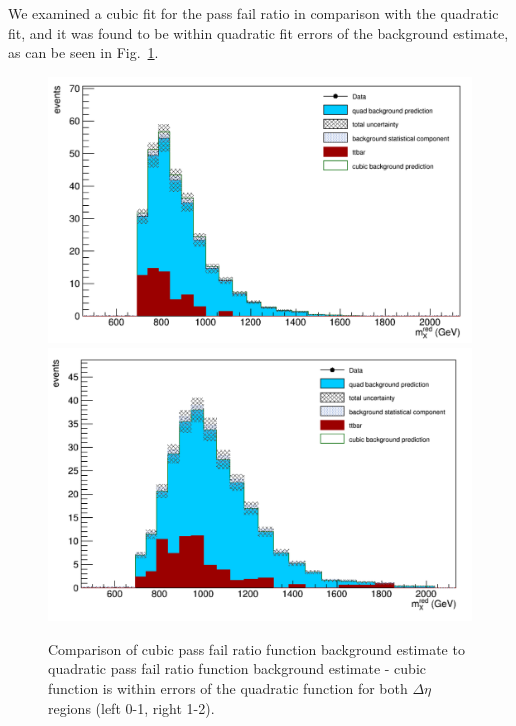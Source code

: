 We examined a cubic fit for the pass fail ratio in comparison with the quadratic fit, and it was found to be within quadratic fit errors of the background estimate, as can be seen in Fig.~\ref{fig:cvqhist}.

\begin{figure}[thb!]
\begin{center}
\includegraphics[scale=0.35]{Figures/dEta1CvQ.pdf}
\includegraphics[scale=0.35]{Figures/dEta2CvQ.pdf}\\
\end{center}
\caption{Comparison of cubic pass fail ratio function background estimate to quadratic pass fail ratio function background estimate - cubic function is within errors of the quadratic function for both $\Delta\eta$ regions (left 0-1, right 1-2).}
\label{fig:cvqhist}
\end{figure}
